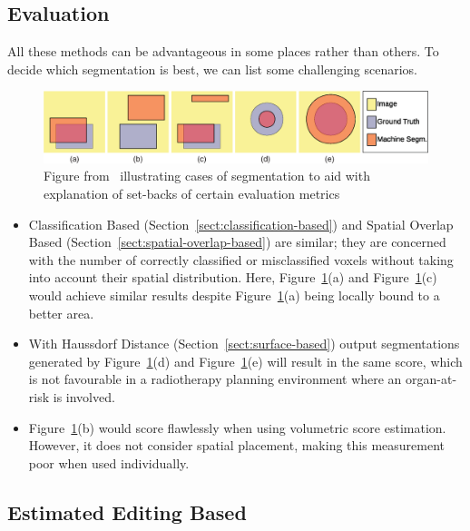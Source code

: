 \documentclass[12pt,twoside]{report}
\begin{document}
\subsection{Evaluation}\label{sect:evaluation-of-evaluation-methods}

All these methods can be advantageous in some places rather than others. To decide which segmentation is best, we can list some challenging scenarios.

\begin{figure}[H]
  \centering
  \includegraphics[width=\linewidth]{../figures/segmentation-cases-1.png}
  \caption{Figure from~\cite{boundary-overlap-metrics} illustrating cases of segmentation to aid with explanation of set-backs of certain evaluation metrics}
 \label{fig:segmentation-cases-1}
\end{figure}

\begin{itemize}
  \item Classification Based (Section~\ref{sect:classification-based}) and Spatial Overlap Based (Section~\ref{sect:spatial-overlap-based}) are similar; they are concerned with the number of correctly classified or misclassified voxels without taking into account their spatial distribution. Here, Figure~\ref{fig:segmentation-cases-1}(a) and Figure~\ref{fig:segmentation-cases-1}(c) would achieve similar results despite Figure~\ref{fig:segmentation-cases-1}(a) being locally bound to a better area.
  \item With Haussdorf Distance (Section~\ref{sect:surface-based}) output segmentations generated by Figure~\ref{fig:segmentation-cases-1}(d) and Figure~\ref{fig:segmentation-cases-1}(e) will result in the same score, which is not favourable in a radiotherapy planning environment where an organ-at-risk is involved.
  \item Figure~\ref{fig:segmentation-cases-1}(b) would score flawlessly when using volumetric score estimation. However, it does not consider spatial placement, making this measurement poor when used individually.
\end{itemize}

\subsection{Estimated Editing Based}\label{sect:surface-dice}
\end{document}
